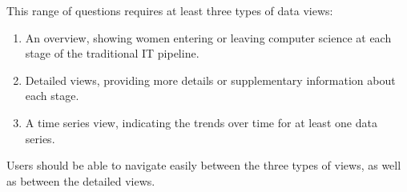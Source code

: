This range of questions requires at least three types of data views:

\begin{enumerate}
  \item An overview, showing women entering or leaving computer science at each stage of the traditional IT pipeline.
  \item Detailed views, providing more details or supplementary information about each stage.
  \item A time series view, indicating the trends over time for at least one data series.
\end{enumerate}

Users should be able to navigate easily between the three types of views, as well as between the detailed views.
